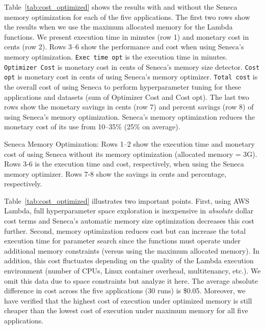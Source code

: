 Table~\ref{tab:cost_optimized} shows the results with and without
the Seneca memory optimization for each of the five applications.
The first two rows show the results when we use the maximum allocated memory 
for the Lambda functions. We present execution time in minutes (row 1) and 
monetary cost in cents (row 2). 
Rows 3--6 show the performance and cost when using Seneca's memory optimization.
\texttt{Exec time opt} is the execution time in minutes.
\texttt{Optimizer Cost} is monetary cost in cents of Seneca's memory size detector.
\texttt{Cost opt} is monetary cost in cents of using Seneca's memory optimizer.
\texttt{Total cost} is the overall cost of using Seneca to perform hyperparameter 
tuning for these applications and datasets (sum of Optimizer Cost and Cost opt).
The last two rows show the monetary savings in cents (row 7) and percent savings (row 8)
of using Seneca's memory optimization.  Seneca's memory optimization reduces
the monetary cost of its use from 10--35\% (25\% on average).


\begin{table}
\centering

\caption{Seneca Memory Optimization: Rows 1--2 show the execution time and  monetary cost 
of using Seneca without its memory optimization (allocated memory = 3G). 
Rows 3-6 is the execution time and cost, 
respectively, when using the Seneca memory optimizer. 
Rows 7-8 show the savings in cents and percentage, respectively.
\label{tab:cost_optimized}}
\end{table}

Table~\ref{tab:cost_optimized} illustrates two important points.
First, using AWS Lambda, full hyperparameter space exploration is inexpensive in
\textit{absolute} dollar cost terms and Seneca's automatic memory size optimization
decreases this cost further.  Second, memory optimization reduces cost but can 
increase the total execution time for parameter search 
since the functions must operate under additional memory 
constraints (versus using the maximum allocated memory).  
In addition, this cost fluctuates depending on the quality of the Lambda
execution environment (number of CPUs, Linux container overhead, 
multitenancy, etc.).  We omit this data due to space constraints but analyze it here.
The average absolute difference in cost
across the five applications (30 runs) is \$0.05. %
Moreover, we have verified that the highest cost of execution under 
optimized memory is still cheaper than the lowest cost of execution under maximum 
memory for all five applications.

